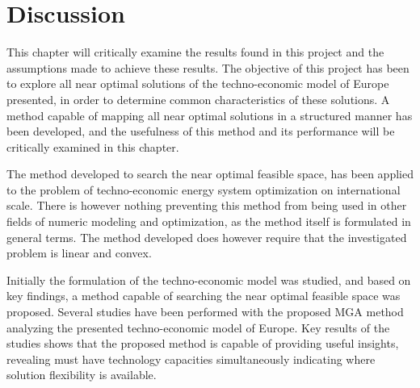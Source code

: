 
\chapter{Discussion}

%

This chapter will critically examine the results found in this project and the assumptions made to achieve these results. The objective of this project has been to explore all near optimal solutions of the techno-economic model of Europe presented, in order to determine common characteristics of these solutions. A method capable of mapping all near optimal solutions in a structured manner has been developed, and the usefulness of this method and its performance will be critically examined in this chapter. 

The method developed to search the near optimal feasible space, has been applied to the problem of techno-economic energy system optimization on international scale. There is however nothing preventing this method from being used in other fields of numeric modeling and optimization, as the method itself is formulated in general terms. The method developed does however require that the investigated problem is linear and convex. 

Initially the formulation of the techno-economic model was studied, and based on key findings, a method capable of searching the near optimal feasible space was proposed. Several studies have been performed with the proposed MGA method analyzing the presented techno-economic model of Europe. Key results of the studies shows that the proposed method is capable of providing useful insights, revealing must have technology capacities simultaneously indicating where solution flexibility is available.

